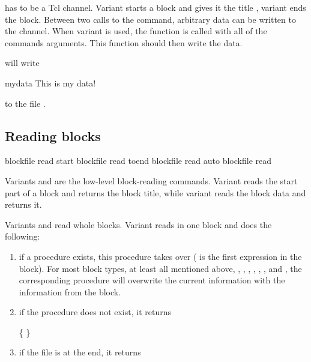  has to be a Tcl channel. Variant  starts a
block and gives it the title , variant  ends the
block. Between two calls to the command, arbitrary data can be written
to the channel.  When variant  is used, the function
 is called with all of the commands
arguments. This function should then write the data.


will write 
\begin{tclcode}
{mydata {This is my data!}}
\end{tclcode}
to the file .

\subsection{Reading blocks}

\begin{essyntax}
   blockfile  read start 
   blockfile  read toend 
   blockfile  read auto 
   blockfile  read 
\end{essyntax}

Variants  and  are the low-level block-reading
commands. Variant  reads the start part of a block and
returns the block title, while variant  reads the block
data and returns it.

Variants  and  read whole blocks.
Variant  reads in one block and does the following:
\begin{enumerate}
\item if a procedure  exists,
  this procedure takes over ( is the first expression in the
  block). For most block types, at least all mentioned above, \ie
  , , ,
  , ,
  , and , the corresponding
  procedure will overwrite the current information with the
  information from the block.
\item if the procedure does not exist, it returns 
  \begin{code}
    \{   \}
  \end{code}
\item if the file is at the end, it returns 
\end{enumerate}

